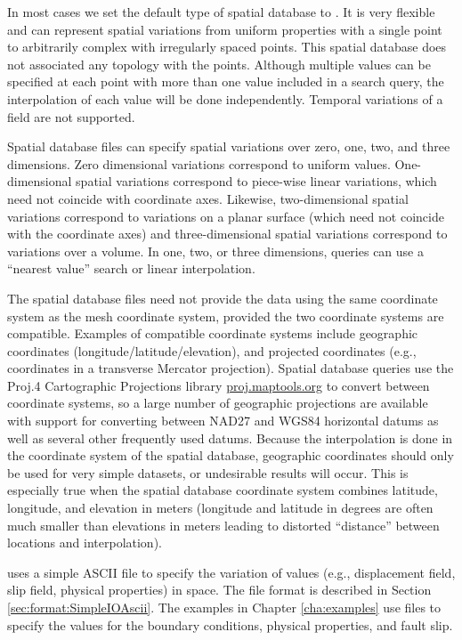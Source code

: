 In most cases we set the default type of spatial database to
. It is very flexible and can represent spatial
variations from uniform properties with a single point to arbitrarily
complex with irregularly spaced points. This spatial database does not
associated any topology with the points. Although multiple values can
be specified at each point with more than one value included in a
search query, the interpolation of each value will be done
independently.  Temporal variations of a field are not supported.

Spatial database files can specify spatial variations over zero, one,
two, and three dimensions. Zero dimensional variations correspond to
uniform values. One-dimensional spatial variations correspond to
piece-wise linear variations, which need not coincide with coordinate
axes. Likewise, two-dimensional spatial variations correspond to
variations on a planar surface (which need not coincide with the
coordinate axes) and three-dimensional spatial variations correspond
to variations over a volume. In one, two, or three dimensions, queries
can use a ``nearest value'' search or linear interpolation.

The spatial database files need not provide the data using the same
coordinate system as the mesh coordinate system, provided the two
coordinate systems are compatible. Examples of compatible coordinate
systems include geographic coordinates (longitude/latitude/elevation),
and projected coordinates (e.g., coordinates in a transverse Mercator
projection). Spatial database queries use the Proj.4 Cartographic
Projections library \url{proj.maptools.org} to convert between coordinate
systems, so a large number of geographic projections are available
with support for converting between NAD27 and WGS84 horizontal datums
as well as several other frequently used datums. Because the interpolation
is done in the coordinate system of the spatial database, geographic
coordinates should only be used for very simple datasets, or undesirable
results will occur. This is especially true when the spatial database
coordinate system combines latitude, longitude, and elevation in meters
(longitude and latitude in degrees are often much smaller than elevations
in meters leading to distorted ``distance'' between locations and
interpolation).

 uses a simple ASCII file to specify the variation of
values (e.g., displacement field, slip field, physical properties) in
space.  The file format is described in Section
\vref{sec:format:SimpleIOAscii}.  The examples in Chapter
\vref{cha:examples} use  files to specify the values
for the boundary conditions, physical properties, and fault slip.

